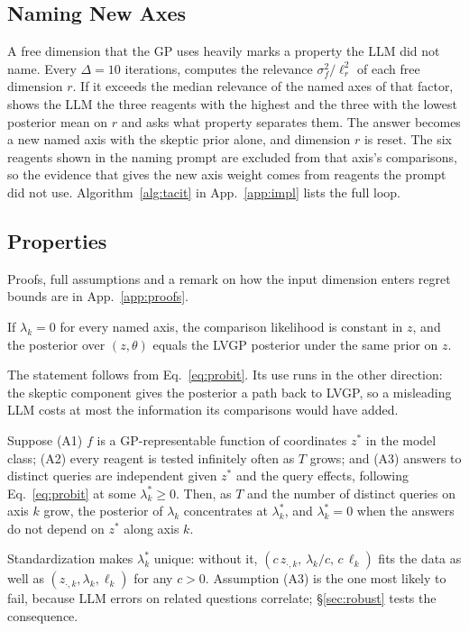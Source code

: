 \subsection{Naming New Axes}
\label{sec:discovery}
A free dimension that the GP uses heavily marks a property the LLM did not name. Every $\Delta=10$ iterations, \ours{} computes the relevance $\sigma_f^2/\ell_r^2$ of each free dimension $r$. If it exceeds the median relevance of the named axes of that factor, \ours{} shows the LLM the three reagents with the highest and the three with the lowest posterior mean on $r$ and asks what property separates them. The answer becomes a new named axis with the skeptic prior alone, and dimension $r$ is reset. The six reagents shown in the naming prompt are excluded from that axis's comparisons, so the evidence that gives the new axis weight comes from reagents the prompt did not use. Algorithm~\ref{alg:tacit} in App.~\ref{app:impl} lists the full loop.

\subsection{Properties}
\label{sec:props}
Proofs, full assumptions and a remark on how the input dimension enters regret bounds are in App.~\ref{app:proofs}.

\begin{proposition}[Reduction]
\label{prop:reduction}
If $\lambda_k=0$ for every named axis, the comparison likelihood is constant in $z$, and the \ours{} posterior over $(z,\theta)$ equals the LVGP posterior under the same prior on $z$.
\end{proposition}
The statement follows from Eq.~\eqref{eq:probit}. Its use runs in the other direction: the skeptic component gives the posterior a path back to LVGP, so a misleading LLM costs at most the information its comparisons would have added.

\begin{proposition}
\label{prop:consistency}
Suppose (A1) $f$ is a GP-representable function of coordinates $z^\ast$ in the model class; (A2) every reagent is tested infinitely often as $T$ grows; and (A3) answers to distinct queries are independent given $z^\ast$ and the query effects, following Eq.~\eqref{eq:probit} at some $\lambda_k^\ast\ge0$. Then, as $T$ and the number of distinct queries on axis $k$ grow, the posterior of $\lambda_k$ concentrates at $\lambda_k^\ast$, and $\lambda_k^\ast=0$ when the answers do not depend on $z^\ast$ along axis $k$.
\end{proposition}
Standardization makes $\lambda_k^\ast$ unique: without it, $(c\,z_{\cdot,k},\,\lambda_k/c,\,c\,\ell_k)$ fits the data as well as $(z_{\cdot,k},\lambda_k,\ell_k)$ for any $c>0$. Assumption (A3) is the one most likely to fail, because LLM errors on related questions correlate; \S\ref{sec:robust} tests the consequence.

